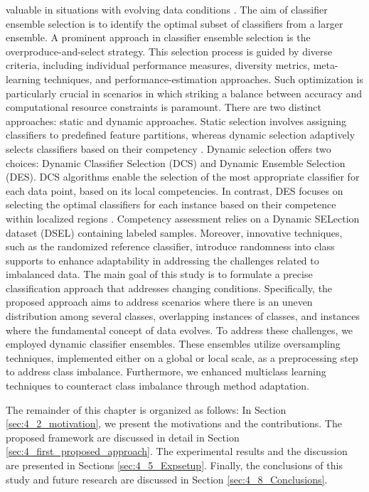   valuable in situations with evolving data conditions \cite{woloszynski2011probabilistic}. The aim of classifier ensemble selection is to identify the optimal subset of
  classifiers from a larger ensemble. A prominent approach in classifier ensemble selection is the overproduce-and-select strategy. This
  selection process is guided by diverse criteria, including individual performance measures, diversity metrics, meta-learning techniques,
  and performance-estimation approaches. Such optimization is particularly crucial in scenarios in which striking a balance between
  accuracy and computational resource constraints is paramount. There are two distinct approaches: static and dynamic approaches.
  Static selection involves assigning classifiers to predefined feature partitions, whereas dynamic selection adaptively selects classifiers
  based on their competency \cite{lysiak2014optimal}. Dynamic selection offers two choices: Dynamic Classifier Selection (DCS) and Dynamic Ensemble
  Selection (DES). DCS algorithms enable the selection of the most appropriate classifier for each data point, based on its local competencies. In contrast, DES focuses on selecting the optimal classifiers for each instance based on their competence within localized
  regions \cite{cruz2017meta}\cite{widmer1996learning}\cite{lu2016concept}. Competency assessment relies on a Dynamic SELection dataset (DSEL) containing labeled samples. Moreover,
  innovative techniques, such as the randomized reference classifier, introduce randomness into class supports to enhance adaptability
  in addressing the challenges related to imbalanced data.
  The main goal of this study is to formulate a precise classification approach that addresses changing conditions. Specifically, the
  proposed approach aims to address scenarios where there is an uneven distribution among several classes, overlapping instances of
  classes, and instances where the fundamental concept of data evolves. To address these challenges, we employed dynamic classifier
  ensembles. These ensembles utilize oversampling techniques, implemented either on a global or local scale, as a preprocessing step to
  address class imbalance. Furthermore, we enhanced multiclass learning techniques to counteract class imbalance through method
  adaptation. 
  
  The remainder of this chapter is organized as follows: In Section \ref{sec:4_2_motivation}, we present the motivations and the contributions. The proposed framework are discussed in detail in Section \ref{sec:4_first_proposed_approach}. The  experimental results and the discussion are presented in Sections \ref{sec:4_5_Expsetup}. Finally, the conclusions of this study and future research are discussed in Section \ref{sec:4_8_Conclusions}. 
  
